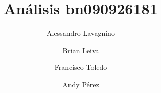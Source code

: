 \documentclass[final,5p,times,twocolumn,authoryear]{elsarticle}
\begin{document}
\begin{frontmatter}



\title{Análisis bn090926181}


\author[ecfm]{Alessandro Lavagnino}
\author[ecfm]{Brian Leiva}
\author[ecfm]{Francisco Toledo}
\author[ecfm]{Andy Pérez}





\end{frontmatter}
\end{document}
